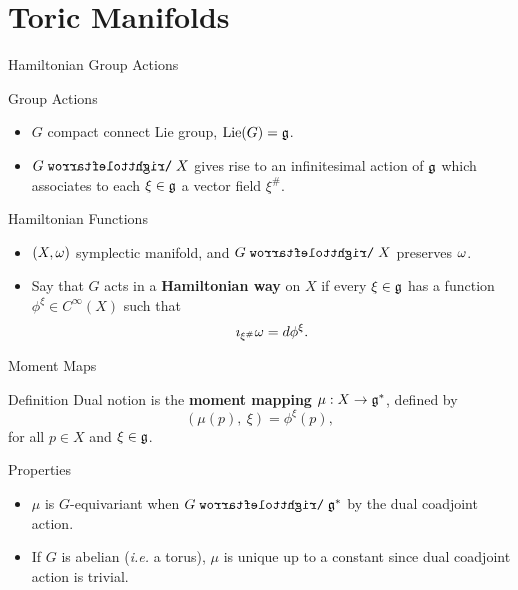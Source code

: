 \section{Toric Manifolds}

\begin{frame}{Hamiltonian Group Actions}
    \begin{block}{Group Actions}
        \begin{itemize}
            \item $G$ compact connect Lie group, $\operatorname{Lie}(G) = \mathfrak{g}$.
            \item $G \acts X$ gives rise to an infinitesimal action of $\mathfrak{g}$ which associates to each $\xi \in \mathfrak{g}$ a vector field $\xi^{\#}$.
        \end{itemize}
    \end{block}
    \begin{block}{Hamiltonian Functions}
        \begin{itemize}
            \item $(X,\omega)$ symplectic manifold, and $G \acts X$ preserves $\omega$.
            \item Say that $G$ acts in a \textbf{Hamiltonian way} on $X$ if every $\xi \in \mathfrak{g}$ has a function $\phi^{\xi} \in C^{\infty}(X)$ such that
            $$ \imath_{\xi^{\#}}\omega = d\phi^{\xi}. $$
        \end{itemize}
    \end{block}
\end{frame}

\begin{frame}{Moment Maps}
    \begin{block}{Definition}
        Dual notion is the \textbf{moment mapping} $\mu : X \rightarrow \mathfrak{g}^{\ast}$, defined by
        $$ ( \mu(p),\ \xi ) = \phi^{\xi}(p), $$
        for all $p \in X$ and $\xi \in \mathfrak{g}$.
    \end{block}
    \begin{block}{Properties}
        \begin{itemize}
            \item $\mu$ is $G$-equivariant when $G \acts \mfg^{\ast}$ by the dual coadjoint action.
            \item If $G$ is abelian (\emph{i.e.} a torus), $\mu$ is unique up to a constant since dual coadjoint action is trivial.
        \end{itemize}
    \end{block}
\end{frame}

